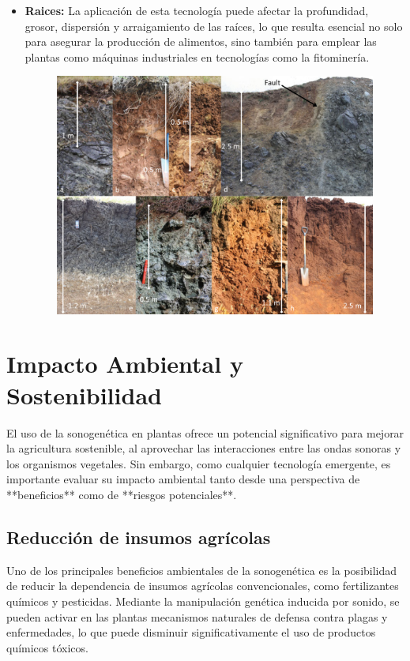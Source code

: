 \documentclass[twocolumn]{article}
\begin{document}
\begin{itemize}
\item \textbf{Raices:} La aplicación de esta tecnología puede afectar la profundidad, grosor, dispersión y arraigamiento de las raíces, lo que resulta esencial no solo para asegurar la producción de alimentos, sino también para emplear las plantas como máquinas industriales en tecnologías como la fitominería.
\begin{figure}[!h]
    \centering
    \includegraphics[width=\linewidth]{imagenes/Captura6.png}       
\end{figure}

\end{itemize}

\section{Impacto Ambiental y Sostenibilidad}

El uso de la sonogenética en plantas ofrece un potencial significativo para mejorar la agricultura sostenible, al aprovechar las interacciones entre las ondas sonoras y los organismos vegetales. Sin embargo, como cualquier tecnología emergente, es importante evaluar su impacto ambiental tanto desde una perspectiva de **beneficios** como de **riesgos potenciales**.

\subsection{Reducción de insumos agrícolas}

Uno de los principales beneficios ambientales de la sonogenética es la posibilidad de reducir la dependencia de insumos agrícolas convencionales, como fertilizantes químicos y pesticidas. Mediante la manipulación genética inducida por sonido, se pueden activar en las plantas mecanismos naturales de defensa contra plagas y enfermedades, lo que puede disminuir significativamente el uso de productos químicos tóxicos.
\end{document}
